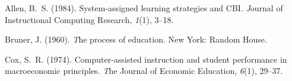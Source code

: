 \begin{singlespace}
\begin{hangpar}

Allen, B.~S. (1984). System-assigned learning strategies and CBI.
{\emph Journal of Instructional Computing Research},
{\emph 1}(1), 3--18.
\filbreak

Bruner, J. (1960). {\emph The process of education}.
New York: Random House.
\filbreak

Cox, S.~R. (1974). Computer-assisted instruction and student performance
in macroeconomic principles.
{\emph The Journal of Economic Education},
{\emph 6}(1), 29--37.
\filbreak

\end{hangpar}
\end{singlespace}
